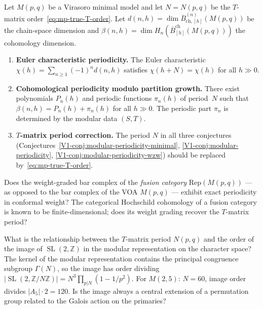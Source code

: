 \documentclass[11pt]{article}
\newcommand{\barB}{\overline{B}}
\newcommand{\Z}{\mathbb{Z}}
\begin{document}
\begin{conjecture}\label{conj:mp-reformulated}
Let $M(p,q)$ be a Virasoro minimal model and let $N = N(p,q)$
be the $T$-matrix order~\eqref{eq:mp-true-T-order}.
Let $d(n,h) = \dim \barB^{(n)}_{\mathrm{ch},[h]}(M(p,q))$ be the
chain-space dimension and
$\beta(n,h) = \dim H_n(\barB^{\mathrm{ch}}_{[h]}(M(p,q)))$ the
cohomology dimension.
\begin{enumerate}[nosep]
\item \textbf{Euler characteristic periodicity.}
  The Euler characteristic
  $\chi(h) = \sum_{n \ge 1} (-1)^n d(n,h)$
  satisfies $\chi(h+N) = \chi(h)$ for all $h \gg 0$.

\item \textbf{Cohomological periodicity modulo partition growth.}
  There exist polynomials $P_n(h)$ and periodic functions
  $\pi_n(h)$ of period~$N$ such that
  $\beta(n,h) = P_n(h) + \pi_n(h)$ for all $h \gg 0$.
  The periodic part $\pi_n$ is determined by the modular data
  $(S,T)$.

\item \textbf{$T$-matrix period correction.}
  The period $N$ in all three conjectures
  \textup{(}Conjectures~\ref*{V1-conj:modular-periodicity-minimal},
  \ref*{V1-conj:modular-periodicity},
  \ref*{V1-conj:modular-periodicity-wzw}\textup{)}
  should be replaced by~\eqref{eq:mp-true-T-order}.
\end{enumerate}
\end{conjecture}

\begin{question}\label{q:mp-fusion-cat-periodicity}
Does the weight-graded bar complex of the \emph{fusion category}
$\mathrm{Rep}(M(p,q))$ --- as opposed to the bar complex of
the VOA $M(p,q)$ --- exhibit exact periodicity in conformal
weight?  The categorical Hochschild cohomology of a fusion
category is known to be finite-dimensional; does its
weight grading recover the $T$-matrix period?
\end{question}

\begin{question}\label{q:mp-connection-to-S-matrix}
What is the relationship between the $T$-matrix period $N(p,q)$
and the order of the image of $\operatorname{SL}(2,\Z)$ in the
modular representation on the character space?  The kernel of
the modular representation contains the principal congruence
subgroup $\Gamma(N)$, so the image has order dividing
$|\operatorname{SL}(2, \Z/N\Z)| = N^3 \prod_{p | N}(1 - 1/p^2)$.
For $M(2,5)$: $N = 60$, image order divides $|A_5| \cdot 2 = 120$.
Is the image always a central extension of a permutation group
related to the Galois action on the primaries?
\end{question}
\end{document}
